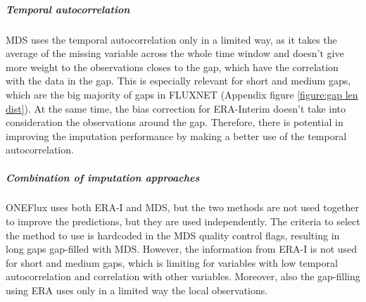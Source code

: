 \documentclass{article}
\begin{document}
\subparagraph{Temporal autocorrelation} MDS uses the temporal autocorrelation only in a limited way, as it takes the average of the missing variable across the whole time window and doesn't give more weight to the observations closes to the gap, which have the correlation with the data in the gap. This is especially relevant for short and medium gaps, which are the big majority of gaps in FLUXNET (Appendix figure \ref{figure:gap len dist}). At the same time, the bias correction for ERA-Interim doesn't take into consideration the observations around the gap. Therefore, there is potential in improving the imputation performance by making a better use of the temporal autocorrelation.

\subparagraph{Combination of imputation approaches} ONEFlux uses both ERA-I and MDS, but the two methods are not used together to improve the predictions, but they are used independently. The criteria to select the method to use is hardcoded in the MDS quality control flags, resulting in long gaps gap-filled with MDS. However, the information from ERA-I is not used for short and medium gaps, which is limiting for variables with low temporal autocorrelation and correlation with other variables. Moreover, also the gap-filling using ERA uses only in a limited way the local observations. 





\end{document}
